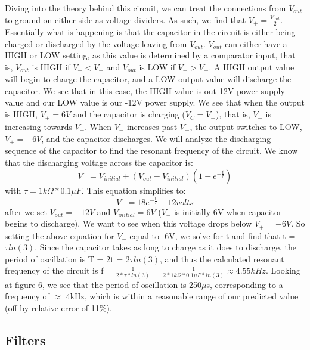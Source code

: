 \documentclass{article}
\begin{document}
    Diving into the theory behind this circuit, we can treat the connections from $V_{out}$ to ground on either side as voltage dividers. As such, we find that $V_+ = \frac{V_{out}}{2}$. Essentially what is happening is that the capacitor in the circuit is either being charged or discharged by the voltage leaving from $V_{out}$. $V_{out}$ can either have a HIGH or LOW setting, as this value is determined by a comparator input, that is, $V_{out}$ is HIGH if $V_- < V_+$ and $V_{out}$ is LOW if $V_- > V_+$. A HIGH output value will begin to charge the capacitor, and a LOW output value will discharge the capacitor. We see that in this case, the HIGH value is out 12V power supply value and our LOW value is our -12V power supply. We see that when the output is HIGH, $V_+ = 6V$ and the capacitor is charging ($V_C = V_-$), that is, $V_-$ is increasing towards $V_+$. When $V_-$ increases past $V_+$, the output switches to LOW, $V_+ = -6V$, and the capacitor discharges. We will analyze the discharging sequence of the capacitor to find the resonant frequency of the circuit. We know that the discharging voltage across the capacitor is:
    \begin{equation}
        V_- = V_{initial} + (V_{out}-V_{initial})(1-e^{-\frac{t}{\tau}})
    \end{equation}
    with $\tau = 1k\Omega*0.1\mu F$. This equation simplifies to:
    \begin{equation}
        V_- = 18e^{-\frac{t}{\tau}}-12 volts
    \end{equation}
    after we set $V_{out} = -12V$ and $V_{initial} = 6V$ ($V_-$ is initially 6V when capacitor begins to discharge). We want to see when this voltage drops below $V_+ = -6V$. So setting the above equation for $V_-$ equal to -6V, we solve for t and find that t = $\tau ln(3)$. Since the capacitor takes as long to charge as it does to discharge, the period of oscillation is T = 2t = $2\tau ln(3)$, and thus the calculated resonant frequency of the circuit is f = $\frac{1}{2*\tau*ln(3)}$ = $\frac{1}{2*1k\Omega*0.1\mu F*ln(3)} \approx 4.55 kHz$. Looking at figure 6, we see that the period of oscillation is 250$\mu$s, corresponding to a frequency of $\approx$ 4kHz, which is within a reasonable range of our predicted value (off by relative error of 11$\%$).
    
    \subsection{Filters}
\end{document}
